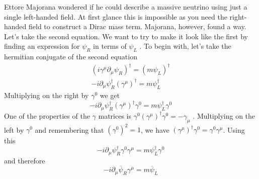 Ettore Majorana wondered if he could describe a massive neutrino using just a single left-handed field. At first glance this is impossible as you need the right-handed field to construct a Dirac mass term. Majorana, however, found a way.
Let’s take the second equation. We want to try to make it look like the first by finding an expression for \(\psi _R\) in terms of \(\psi_L\) . To begin with, let’s take the hermitian conjugate of the second equation
\begin{equation}
\label{eq:weyl_eq_massive_neutrino}
    \begin{gathered}
        (i \gamma ^\mu \partial_\mu \psi _R)^\dagger = (m \psi _L)^\dagger\\
        -i \partial_\mu \psi _R ^\dagger (\gamma ^\mu) ^\dagger = m \psi _L ^\dagger
    \end{gathered}
\end{equation}
Multiplying on the right by \(\gamma^0\) we get
\begin{equation}
    -i \partial_\mu \psi _R ^\dagger(\gamma ^\mu) ^\dagger \gamma^0 = m \psi _L ^\dagger\gamma^0
\end{equation}
One of the properties of the \(\gamma\) matrices is \(\gamma^0 (\gamma^\mu) ^\dagger\gamma^0 = - \gamma_\mu\) . Multiplying on the left by \(\gamma^0\) and remembering that \((\gamma^0)^2 = 1\), we have \((\gamma^\mu) ^\dagger\gamma^0 = \gamma^0\gamma^\mu\). Using this
\begin{equation}
    -i \partial_\mu \psi _R ^\dagger \gamma^0 \gamma^\mu = m \psi _L ^\dagger\gamma^0
\end{equation}
and therefore 
\begin{equation}
    -i \partial_\mu \overline {\psi} _R \gamma ^\mu = m \overline {\psi}_L
\end{equation}

